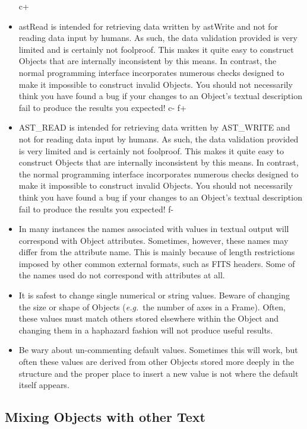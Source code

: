 \documentclass[twoside,11pt]{article}
\begin{document}
\begin{itemize}
c+
\item astRead is intended for retrieving data written by astWrite and
not for reading data input by humans. As such, the data validation
provided is very limited and is certainly not foolproof. This makes it
quite easy to construct Objects that are internally inconsistent by
this means. In contrast, the normal programming interface incorporates
numerous checks designed to make it impossible to construct invalid
Objects. You should not necessarily think you have found a bug if your
changes to an Object's textual description fail to produce the results
you expected!
c-
f+
\item AST\_READ is intended for retrieving data written by AST\_WRITE
and not for reading data input by humans. As such, the data validation
provided is very limited and is certainly not foolproof. This makes it
quite easy to construct Objects that are internally inconsistent by
this means. In contrast, the normal programming interface incorporates
numerous checks designed to make it impossible to construct invalid
Objects. You should not necessarily think you have found a bug if your
changes to an Object's textual description fail to produce the results
you expected!
f-

\item In many instances the names associated with values in textual
output will correspond with Object attributes. Sometimes, however,
these names may differ from the attribute name. This is mainly because
of length restrictions imposed by other common external formats, such
as FITS headers. Some of the names used do not correspond with
attributes at all.

\item It is safest to change single numerical or string values.
Beware of changing the size or shape of Objects ({\em{e.g.}}\ the
number of axes in a Frame). Often, these values must match others
stored elsewhere within the Object and changing them in a haphazard
fashion will not produce useful results.

\item Be wary about un-commenting default values. Sometimes this will
work, but often these values are derived from other Objects stored
more deeply in the structure and the proper place to insert a new
value is not where the default itself appears.
\end{itemize}

\subsection{\label{ss:mixingchanneltext}Mixing Objects with other Text}
\end{document}
